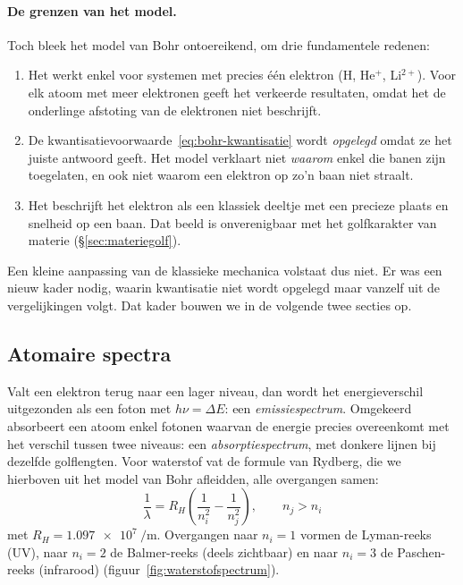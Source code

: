 \paragraph{De grenzen van het model.}
Toch bleek het model van Bohr ontoereikend, om drie fundamentele redenen:
\begin{enumerate}
\item Het werkt enkel voor systemen met precies één elektron (H, He$^+$, Li$^{2+}$). Voor elk atoom met meer elektronen geeft het verkeerde resultaten, omdat het de onderlinge afstoting van de elektronen niet beschrijft.
\item De kwantisatievoorwaarde~\eqref{eq:bohr-kwantisatie} wordt \emph{opgelegd} omdat ze het juiste antwoord geeft. Het model verklaart niet \emph{waarom} enkel die banen zijn toegelaten, en ook niet waarom een elektron op zo'n baan niet straalt.
\item Het beschrijft het elektron als een klassiek deeltje met een precieze plaats en snelheid op een baan. Dat beeld is onverenigbaar met het golfkarakter van materie (\S\ref{sec:materiegolf}).
\end{enumerate}
Een kleine aanpassing van de klassieke mechanica volstaat dus niet. Er was een nieuw kader nodig, waarin kwantisatie niet wordt opgelegd maar vanzelf uit de vergelijkingen volgt. Dat kader bouwen we in de volgende twee secties op.

\subsection{Atomaire spectra}
\label{sec:atomaire-spectra}

Valt een elektron terug naar een lager niveau, dan wordt het energieverschil uitgezonden als een foton met $h\nu = \Delta E$: een \emph{emissiespectrum}. Omgekeerd absorbeert een atoom enkel fotonen waarvan de energie precies overeenkomt met het verschil tussen twee niveaus: een \emph{absorptiespectrum}, met donkere lijnen bij dezelfde golflengten. Voor waterstof vat de formule van Rydberg, die we hierboven uit het model van Bohr afleidden, alle overgangen samen:
\begin{equation}
\boxed{
\frac{1}{\lambda} = R_H\left(\frac{1}{n_i^2}-\frac{1}{n_j^2}\right), \qquad n_j > n_i
}
\end{equation}
met $R_H = \SI{1.097e7}{\per\meter}$. Overgangen naar $n_i=1$ vormen de Lyman-reeks (UV), naar $n_i=2$ de Balmer-reeks (deels zichtbaar) en naar $n_i=3$ de Paschen-reeks (infrarood) (figuur~\ref{fig:waterstofspectrum}).

